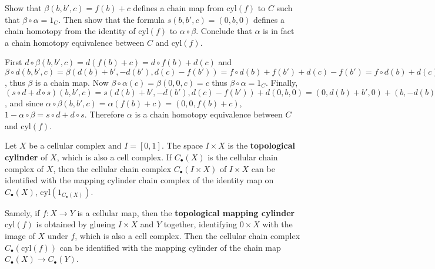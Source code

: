 \begin{exer} Show that $\beta(b,b',c)=f(b)+c$ defines a chain map from $\textrm{cyl}(f)$ to $C$ such that $\beta\circ \alpha=1_C$. Then show that the formula $s(b,b',c)=(0,b,0)$ defines a chain homotopy from the identity of $\textrm{cyl}(f)$ to $\alpha\circ \beta$. Conclude that $\alpha$ is in fact a chain homotopy equivalence between $C$ and $\textrm{cyl}(f)$.
\end{exer}
\begin{solution} First $d\circ \beta(b,b',c)=d(f(b)+c)=d\circ f(b)+d(c)$ and $\beta\circ d(b,b',c)=\beta(d(b)+b',-d(b'),d(c)-f(b'))=f\circ d(b)+f(b')+d(c)-f(b')=f\circ d(b)+d(c)$, thus $\beta$ is a chain map. Now $\beta\circ \alpha(c)=\beta(0,0,c)=c$ thus $\beta\circ \alpha=1_C$. Finally, $(s\circ d+d\circ s)(b,b',c)=s(d(b)+b',-d(b'),d(c)-f(b'))+d(0,b,0)=(0,d(b)+b',0)+(b,-d(b),-f(b))=(b,b',-f(b))=(b,b',c)-(0,0,f(b)+c)$, and since $\alpha\circ \beta(b,b',c)=\alpha(f(b)+c)=(0,0,f(b)+c)$, $1-\alpha\circ \beta=s\circ d+d\circ s$. Therefore $\alpha$ is a chain homotopy equivalence between $C$ and $\textrm{cyl}(f)$.
\end{solution}

\begin{defn} Let $X$ be a cellular complex and $I=[0,1]$. The space $I\times X$ is the \textbf{topological cylinder} of $X$, which is also a cell complex. If $C_\bullet(X)$ is the cellular chain complex of $X$, then the cellular chain complex $C_\bullet(I\times X)$ of $I\times X$ can be identified with the mapping cylinder chain complex of the identity map on $C_\bullet(X)$, $\textrm{cyl}(1_{C_\bullet(X)})$.

Samely, if $f:X\rightarrow Y$ is a cellular map, then the \textbf{topological mapping cylinder} $\textrm{cyl}(f)$ is obtained by glueing $I\times X$ and $Y$ together, identifying $0\times X$ with the image of $X$ under $f$, which is also a cell complex. Then the cellular chain complex $C_\bullet(\textrm{cyl}(f))$ can be identified with the mapping cylinder of the chain map $C_\bullet(X)\rightarrow C_\bullet(Y)$.
\end{defn}

